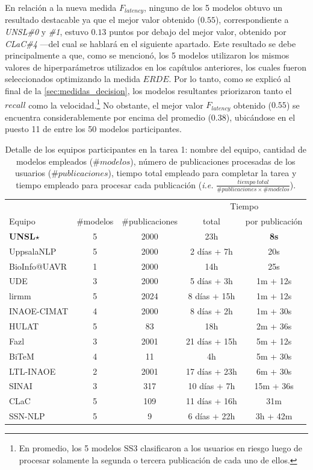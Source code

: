 \begin{itemize}
    En relación a la nueva medida $F_{latency}$, ninguno de los 5 modelos obtuvo un resultado destacable ya que el mejor valor obtenido ($0.55$), correspondiente a \emph{UNSL\#0} y \emph{\#1}, estuvo $0.13$ puntos por debajo del mejor valor, obtenido por \emph{CLaC\#4} ---del cual se hablará en el siguiente apartado.
    Este resultado se debe principalmente a que, como se mencionó, los 5 modelos utilizaron los mismos valores de hiperparámetros utilizados en los capítulos anteriores, los cuales fueron seleccionados optimizando la medida $ERDE$.
    Por lo tanto, como se explicó al final de la \autoref{sec:medidas_decision}, los modelos resultantes priorizaron tanto el $recall$ como la velocidad.\footnote{En promedio, los 5 modelos SS3 clasificaron a los usuarios en riesgo luego de procesar solamente la segunda o tercera publicación de cada uno de ellos.}
    No obstante, el mejor valor $F_{latency}$ obtenido ($0.55$) se encuentra considerablemente por encima del promedio ($0.38$), ubicándose en el puesto 11 de entre los 50 modelos participantes.
\begin{table}[t!]
\centering
\caption{Detalle de los equipos participantes en la tarea 1: nombre del equipo, cantidad de modelos empleados ($\#modelos$), número de publicaciones procesadas de los usuarios ($\#publicaciones$), tiempo total empleado para completar la tarea y tiempo empleado para procesar cada publicación (\emph{i.e.} $\frac{tiempo\ total}{\#publicaciones\times\#modelos}$).}
\label{tab:t1-time}
\begin{tabular}{l c c|c | c}
\hline
& & & \multicolumn{2}{c}{Tiempo} \\
Equipo & \#modelos & \#publicaciones & total & por publicación  \\ \hline

\textbf{UNSL}$\star$ & 5 & 2000 & 23h & \textbf{8s} \\
UppsalaNLP & 5 & 2000 & 2 días + 7h & 20s \\
BioInfo@UAVR & 1 & 2000 & 14h & 25s \\
UDE & 3 & 2000 & 5 días + 3h & 1m + 12s \\
lirmm & 5 & 2024 & 8 días + 15h & 1m + 12s \\
INAOE-CIMAT & 4 & 2000 & 8 días + 2h & 1m + 30s \\
HULAT & 5 & 83 & 18h & 2m + 36s \\
Fazl & 3 & 2001 & 21 días + 15h & 5m + 12s \\
BiTeM & 4 & 11 & 4h & 5m + 30s \\
LTL-INAOE & 2 & 2001 & 17 días + 23h & 6m + 30s \\
SINAI & 3 & 317 & 10 días + 7h & 15m + 36s \\
CLaC & 5 & 109 & 11 días + 16h & 31m \\
SSN-NLP & 5 & 9 & 6 días + 22h & 3h + 42m \\


\end{tabular}
\end{table}
\end{itemize}

